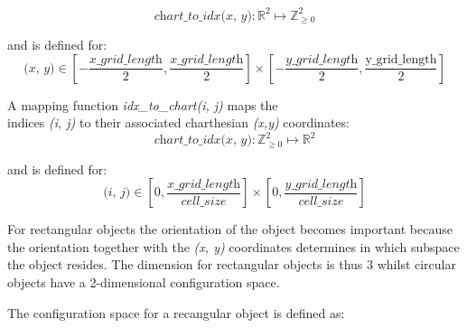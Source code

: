 \[\textit{chart\_to\_idx(x, y)}: \mathbb{R}^2 \mapsto \mathbb{Z}_{\geq 0}^2 \]

and is defined for: 
\[ \textit{(x, y)} \in [-\frac{\textit{x\_grid\_length}}{2}, \frac{\textit{x\_grid\_length}}{2}] \times [-\frac{\textit{y\_grid\_length}}{2}, \frac{\textrm{y\_grid\_length}}{2}]\]

A mapping function \textit{idx\_to\_chart(i, j)} maps the\\indices \textit{(i, j)} to their associated charthesian \textit{(x,y)} coordinates:
\[\textit{chart\_to\_idx(x, y)}: \mathbb{Z}_{\geq 0}^2  \mapsto \mathbb{R}^2 \]

and is defined for:
\[ \textit{(i, j)} \in [0, \frac{\textit{x\_grid\_length}}{\textit{cell\_size}}] \times [0, \frac{\textit{y\_grid\_length}}{\textit{cell\_size}}]\]


For rectangular objects the orientation of the object becomes important because the orientation together with the \textit{(x, y)} coordinates determines in which subspace the object resides. The dimension for rectangular objects is thus 3 whilst circular objects have a 2-dimensional configuration space.\bs

The configuration space for a recangular object is defined as:\bs



